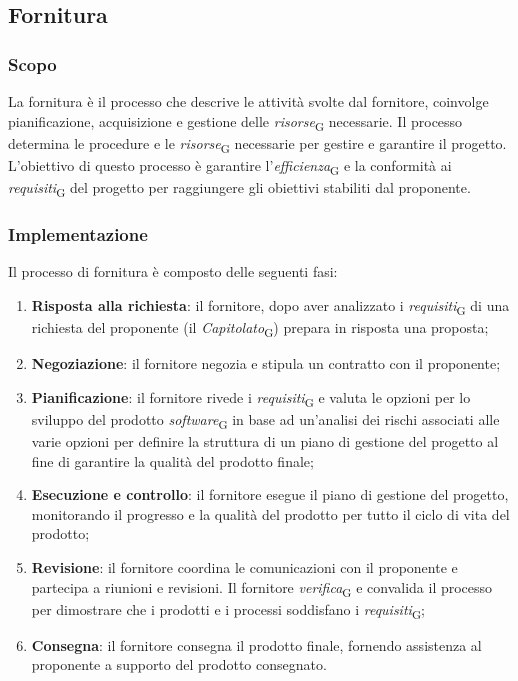 \subsection{Fornitura}
\subsubsection{Scopo}
La fornitura è il processo che descrive le attività svolte dal fornitore, coinvolge pianificazione, acquisizione e gestione delle \textit{risorse}\textsubscript{G} necessarie. Il processo determina le procedure e le \textit{risorse}\textsubscript{G} necessarie per gestire e garantire il progetto. L'obiettivo di questo processo è garantire l'\textit{efficienza}\textsubscript{G} e la conformità ai \textit{requisiti}\textsubscript{G} del progetto per raggiungere gli obiettivi stabiliti dal proponente. 
\subsubsection{Implementazione}
Il processo di fornitura è composto delle seguenti fasi:
\begin{enumerate}
    \item \textbf{Risposta alla richiesta}: il fornitore, dopo aver analizzato i \textit{requisiti}\textsubscript{G} di una richiesta del proponente (il \textit{Capitolato}\textsubscript{G}) prepara in risposta una proposta;
    \item \textbf{Negoziazione}: il fornitore negozia e stipula un contratto con il proponente;
    \item \textbf{Pianificazione}: il fornitore rivede i \textit{requisiti}\textsubscript{G} e valuta le opzioni per lo sviluppo del prodotto \textit{software}\textsubscript{G} in base ad un'analisi dei rischi associati alle varie opzioni per definire la struttura di un piano di gestione del progetto al fine di garantire la qualità del prodotto finale;
    \item \textbf{Esecuzione e controllo}: il fornitore esegue il piano di gestione del progetto, monitorando il progresso e la qualità del prodotto per tutto il ciclo di vita del prodotto;
    \item \textbf{Revisione}: il fornitore coordina le comunicazioni con il proponente e partecipa a riunioni e revisioni. Il fornitore \textit{verifica}\textsubscript{G} e convalida il processo per dimostrare che i prodotti e i processi soddisfano i \textit{requisiti}\textsubscript{G};
    \item \textbf{Consegna}: il fornitore consegna il prodotto finale, fornendo assistenza al proponente a supporto del prodotto consegnato.
\end{enumerate}

